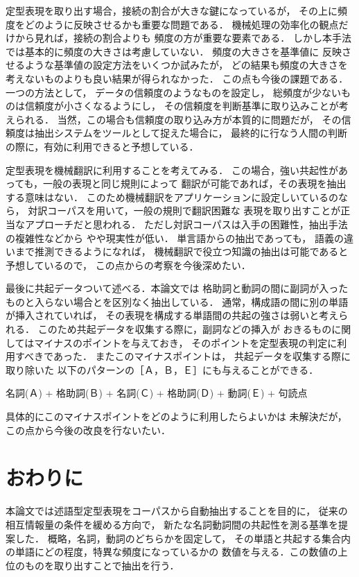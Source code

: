 定型表現を取り出す場合，接続の割合が大きな鍵になっているが，
その上に頻度をどのように反映させるかも重要な問題である．
機械処理の効率化の観点だけから見れば，接続の割合よりも
頻度の方が重要な要素である\cite{kita2}．
しかし本手法では基本的に頻度の大きさは考慮していない．
頻度の大きさを基準値に
反映させるような基準値の設定方法をいくつか試みたが，
どの結果も頻度の大きさを考えないものよりも良い結果が得られなかった．
この点も今後の課題である．
一つの方法として，
データの信頼度のようなものを設定し\cite{tamoto}，
総頻度が少ないものは信頼度が小さくなるようにし，
その信頼度を判断基準に取り込みことが考えられる．
当然，この場合も信頼度の取り込み方が本質的に問題だが，
その信頼度は抽出システムをツールとして捉えた場合に，
最終的に行なう人間の判断の際に，有効に利用できると予想している．

定型表現を機械翻訳に利用することを考えてみる．
この場合，強い共起性があっても，一般の表現と同じ規則によって
翻訳が可能であれば，その表現を抽出する意味はない．
このため機械翻訳をアプリケーションに設定しいているのなら，
対訳コーパスを用いて，一般の規則で翻訳困難な
表現を取り出すことが正当なアプローチだと思われる\cite{matsumoto}．
ただし対訳コーパスは入手の困難性，抽出手法の複雑性などから
やや現実性が低い．
単言語からの抽出であっても，
語義の違いまで推測できるようになれば，
機械翻訳で役立つ知識の抽出は可能であると予想しているので，
この点からの考察を今後深めたい．

最後に共起データついて述べる．本論文では
格助詞と動詞の間に副詞が入ったものと入らない場合とを区別なく抽出している．
通常，構成語の間に別の単語が挿入されていれば，
その表現を構成する単語間の共起の強さは弱いと考えられる．
このため共起データを収集する際に，副詞などの挿入が
おきるものに関してはマイナスのポイントを与えておき，
そのポイントを定型表現の判定に利用すべきであった．
またこのマイナスポイントは，
共起データを収集する際に取り除いた
以下のパターンの［Ａ，Ｂ，Ｅ］にも与えることができる．
\begin{center}
名詞(Ａ) + 格助詞(Ｂ) +  名詞(Ｃ) + 格助詞(Ｄ) + 動詞(Ｅ) + 句読点  
\end{center}
具体的にこのマイナスポイントをどのように利用したらよいかは
未解決だが，この点から今後の改良を行ないたい．


\section{おわりに}

本論文では述語型定型表現をコーパスから自動抽出することを目的に，
従来の相互情報量の条件を緩める方向で，
新たな名詞動詞間の共起性を測る基準を提案した．
概略，名詞，動詞のどちらかを固定して，
その単語と共起する集合内の単語にどの程度，特異な頻度になっているかの
数値を与える．この数値の上位のものを取り出すことで抽出を行う．

